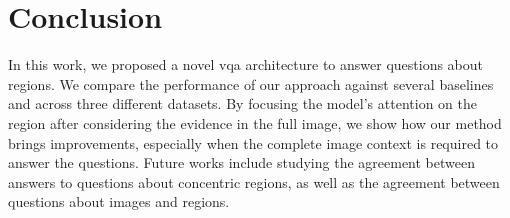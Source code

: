 \section{Conclusion}

In this work, we proposed a novel \gls{vqa} architecture to answer questions about regions. We compare the performance of our approach against several baselines and across three different datasets. By focusing the model's attention on the region after considering the evidence in the full image, we show how our method brings improvements, especially when the complete image context is required to answer the questions. Future works include studying the agreement between answers to questions about concentric regions, as well as the agreement between questions about images and regions.